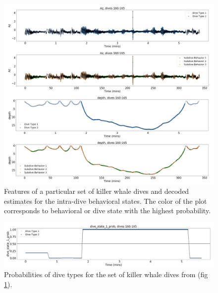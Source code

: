 
\begin{figure}[ht]
	\centering
	\includegraphics[width=5in]{../Plots/labeled_dives.png}
	\caption{Features of a particular set of killer whale dives and decoded estimates for the intra-dive behavioral states. The color of the plot corresponds to behavioral or dive state with the highest probability.}
	\label{fig:labeled_dives}
\end{figure}
%
\begin{figure}[ht]
	\centering
	\includegraphics[width=5in]{../Plots/Coarse_state_probs.png}
	\caption{Probabilities of dive types for the set of killer whale dives from (fig \ref{fig:labeled_dives}).}
	\label{fig:coarse_probs}
\end{figure}
%
